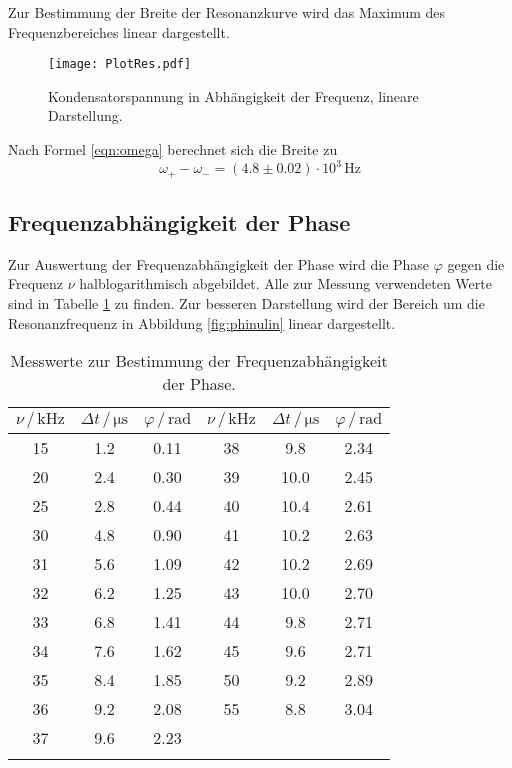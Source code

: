 Zur Bestimmung der Breite der Resonanzkurve wird das Maximum des Frequenzbereiches linear dargestellt.
\begin{figure}
  \centering
  \texttt{[image: PlotRes.pdf]}
  \caption{Kondensatorspannung in Abhängigkeit der Frequenz, lineare Darstellung.}
  \label{fig:lin}
\end{figure}

Nach Formel \eqref{eqn:omega} berechnet sich die Breite zu
\begin{equation}
  \omega_+ - \omega_- = (4.8\pm0.02)\cdot 10^3\,\si{\hertz}
\end{equation}

\subsection{Frequenzabhängigkeit der Phase}
Zur Auswertung der Frequenzabhängigkeit der Phase wird die Phase $\varphi$ gegen die Frequenz $\nu$ halblogarithmisch abgebildet.
Alle zur Messung verwendeten Werte sind in Tabelle \ref{tab:phinu} zu finden. Zur besseren Darstellung wird der Bereich um die Resonanzfrequenz in
Abbildung \ref{fig:phinulin} linear dargestellt.
\begin{table}
  \centering
  \begin{tabular}{ccc||ccc}
    \toprule
    {$\nu\,/\,\si{\kilo\hertz}$} & {$\Delta t\,/\,\si{\micro\second}$} & {$\varphi\,/\,\text{rad}$} &
    {$\nu\,/\,\si{\kilo\hertz}$} & {$\Delta t\,/\,\si{\micro\second}$} & {$\varphi\,/\,\text{rad}$} \\
    \midrule
    15 & 1.2  & 0.11 & 38 & 9.8  & 2.34 \\
    20 & 2.4  & 0.30 & 39 & 10.0 & 2.45 \\
    25 & 2.8  & 0.44 & 40 & 10.4 & 2.61 \\
    30 & 4.8  & 0.90 & 41 & 10.2 & 2.63 \\
    31 & 5.6  & 1.09 & 42 & 10.2 & 2.69 \\
    32 & 6.2  & 1.25 & 43 & 10.0 & 2.70 \\
    33 & 6.8  & 1.41 & 44 & 9.8  & 2.71 \\
    34 & 7.6  & 1.62 & 45 & 9.6  & 2.71 \\
    35 & 8.4  & 1.85 & 50 & 9.2  & 2.89 \\
    36 & 9.2  & 2.08 & 55 & 8.8  & 3.04 \\
    37 & 9.6  & 2.23 &    &      &       \\
    \bottomrule
  \caption{Messwerte zur Bestimmung der Frequenzabhängigkeit der Phase.}
  \label{tab:phinu}
\end{tabular}
\end{table}

